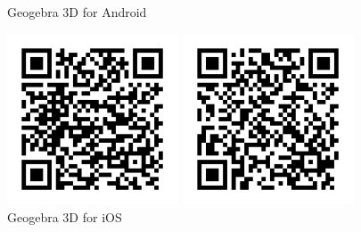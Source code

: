 \documentclass[12pt,fleqn]{book}
\begin{document}
\begin{figure}[h]
\begin{minipage}{.5\textwidth}
  \centering
	\caption*{Geogebra 3D for Android}
	\includegraphics[width=2in]{geogebra-android-qr}
\end{minipage}%
\begin{minipage}{.5\textwidth}
  \centering
	\caption*{Geogebra 3D for iOS}
	\includegraphics[width=2in]{geogebra-ios-qr}
\end{minipage}
\end{figure}
\end{document}
